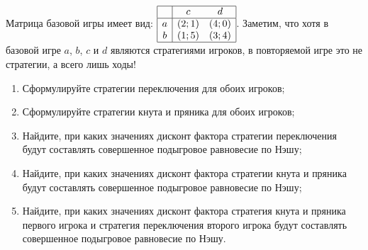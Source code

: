 \begin{problem}

Матрица базовой игры имеет вид:  $\begin{array}{|c|cc|}  \hline {} & {c} & {d} \\  \hline {a} & {\left(2;1\right)} & {\left(4;0\right)} \\ {b} & {\left(1;5\right)} & {\left(3;4\right)} \\  \hline  \end{array}$.
Заметим, что хотя в базовой игре  $a$,  $b$,  $c$  и  $d$  являются стратегиями игроков, в повторяемой игре это не стратегии, а всего лишь ходы!\par
\begin{enumerate}
\item Сформулируйте стратегии переключения для обоих игроков;\par
\item Сформулируйте стратегии кнута и пряника для обоих игроков;\par
\item  Найдите, при каких значениях дисконт фактора стратегии переключения будут составлять совершенное подыгровое равновесие по Нэшу;\par
\item Найдите, при каких значениях дисконт фактора стратегии кнута и пряника будут составлять совершенное подыгровое равновесие по Нэшу;\par
\item Найдите, при каких значениях дисконт фактора стратегия кнута и пряника первого игрока и стратегия переключения второго игрока будут составлять совершенное подыгровое равновесие по Нэшу.
\end{enumerate}


\begin{sol}

\end{sol}
\end{problem}



